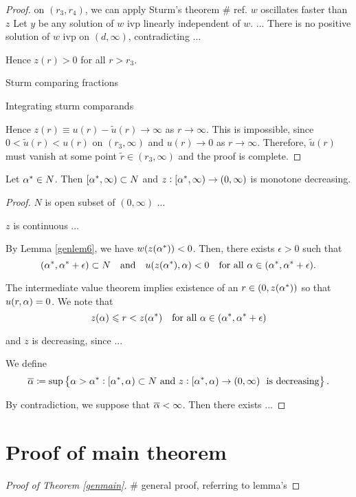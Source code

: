 \begin{proof}
on $(r_3, r_4)$, we can apply Sturm's theorem \# ref. {\red $w$ oscillates
faster than $z$} Let $y$ be any solution of $w$ ivp linearly independent of
$w$. ... There is no positive solution of $w$ ivp on $(d, \infty)$,
contradicting ...

Hence $z(r) > 0$ for all $r > r_3$. %

Sturm comparing fractions

Integrating sturm comparands

Hence $z(r) \equiv u(r) - \tilde{u}(r) \to \infty$ as $r \to \infty$. This is
impossible, since $0 < \tilde{u}(r) < u(r)$ on $(r_3, \infty)$ and $u(r) \to 0$
as $r \to \infty$. Therefore, $\tilde{u}(r)$ must vanish at some point
$\tilde{r} \in (r_3, \infty)$ and the proof is complete.
 
\end{proof}

\begin{lemma}\label{genlem8}
Let $\alpha^{*} \in N$. Then $\left[ \alpha^{*}, \infty \right) \subset N$ and $z : \left[
\alpha^{*}, \infty \right) \to (0, \infty)$ is monotone decreasing.
\end{lemma}
\begin{proof}
$N$ is open subset of $(0, \infty)$ ...

$z$ is continuous ...

By Lemma \ref{genlem6}, we have $w(z(\alpha^{*})) < 0$. Then, there exists $\epsilon >
0$ such that
\[ (\alpha^{*}, \alpha^{*} + \epsilon) \subset N\quad\text{and}\quad u(z(\alpha^{*}), \alpha) < 0\quad
\text{for all} ~ \alpha \in (\alpha^{*}, \alpha^{*} + \epsilon). \]

The intermediate value theorem implies existence of an $r \in (0, z(\alpha^{*}))$ so
that $u(r, \alpha) = 0$. We note that 
\[ z(\alpha) \leqslant r < z(\alpha^{*})\quad\text{for all} ~ \alpha \in (\alpha^{*}, \alpha^{*} + \epsilon) \]

and $z$ is decreasing, since ...

We define
\[ \overline{\alpha} \coloneqq \sup \left\{ \alpha > \alpha^{*} : \left[ \alpha^{*}, \alpha \right) \subset N ~
\text{and} ~ z : \left[ \alpha^{*}, \alpha \right) \to (0, \infty) ~ \text{ is decreasing}
\right\}. \]


By contradiction, we suppose that $\overline{\alpha} < \infty$. Then there exists ...
\end{proof}

\section{Proof of main theorem}
\begin{proof}[Proof of Theorem \ref{genmain}]
\# general proof, referring to lemma's
\end{proof}

